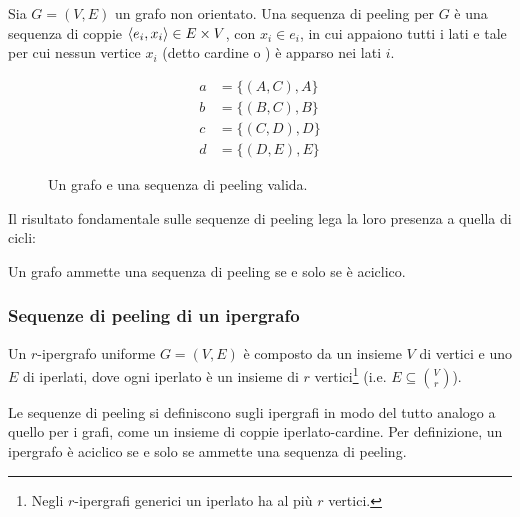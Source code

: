 \begin{defin}
	Sia $G=(V,E)$ un grafo non orientato. Una sequenza di peeling per $G$ è una sequenza di coppie $\langle e_i,x_i \rangle\in E\times V$, con $x_i\in e_i$, in cui appaiono tutti i lati e tale per cui nessun vertice $x_i$ (detto cardine o ) è apparso nei lati $i$.
\end{defin}

\begin{figure}[ht]
	\begin{center}
		\begin{subfigure}[b]{0.45\textwidth}
			\begin{center}
				
			\end{center}
		\end{subfigure}
		\begin{subfigure}[b]{0.45\textwidth}
			\begin{center}
				\begin{align*}
					a & = \{(A, C), A\} \\
					b & = \{(B, C), B\} \\
					c & = \{(C, D), D\} \\
					d & = \{(D, E), E\}
				\end{align*}
			\end{center}
		\end{subfigure}
	\end{center}
	\caption{Un grafo e una sequenza di peeling valida.}%
	\label{fig:example_peeling}
\end{figure}

Il risultato fondamentale sulle sequenze di peeling lega la loro presenza a quella di cicli:
\begin{theorem}
	Un grafo ammette una sequenza di peeling se e solo se è aciclico.
\end{theorem}

\subsubsection{Sequenze di peeling di un ipergrafo}
Un $r$-ipergrafo uniforme $G=(V,E)$ è composto da un insieme $V$ di vertici e uno $E$ di iperlati, dove ogni iperlato è un insieme di $r$ vertici\footnote{Negli $r$-ipergrafi generici un iperlato ha al più $r$ vertici.} (i.e. $E\subseteq\binom{V}{r}$).

Le sequenze di peeling si definiscono sugli ipergrafi in modo del tutto analogo a quello per i grafi, come un insieme di coppie iperlato-cardine. Per definizione, un ipergrafo è aciclico se e solo se ammette una sequenza di peeling.



